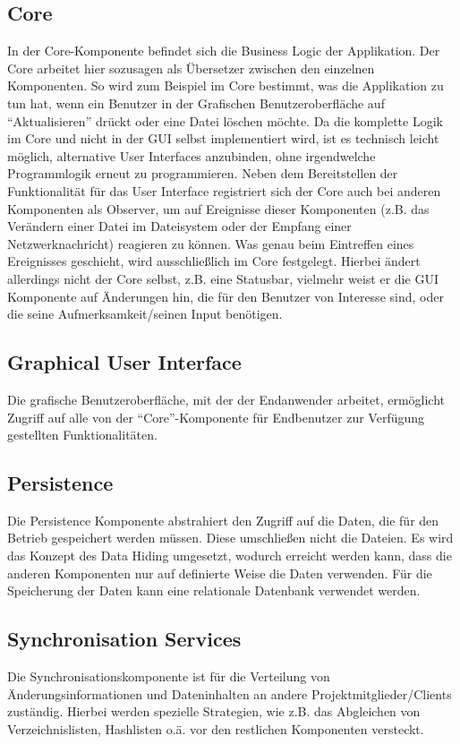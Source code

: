 \subsection{Core}
In der Core-Komponente befindet sich die Business Logic der Applikation. Der Core arbeitet hier sozusagen als Übersetzer zwischen den einzelnen Komponenten. So wird zum Beispiel im Core bestimmt, was die Applikation zu tun hat, wenn ein Benutzer in der Grafischen Benutzeroberfläche auf ``Aktualisieren'' drückt oder eine Datei löschen möchte. Da die komplette Logik im Core und nicht in der GUI selbst implementiert wird, ist es technisch leicht möglich, alternative User Interfaces anzubinden, ohne irgendwelche Programmlogik erneut zu programmieren. 
Neben dem Bereitstellen der Funktionalität für das User Interface registriert sich der Core auch bei anderen Komponenten als Observer, um auf Ereignisse dieser Komponenten (z.B. das Verändern einer Datei im Dateisystem oder der Empfang einer Netzwerknachricht) reagieren zu können. Was genau beim Eintreffen eines Ereignisses geschieht, wird ausschließlich im Core festgelegt. Hierbei ändert allerdings nicht der Core selbst, z.B. eine Statusbar, vielmehr weist er die GUI Komponente auf Änderungen hin, die für den Benutzer von Interesse sind, oder die seine Aufmerksamkeit/seinen Input benötigen.

\subsection{Graphical User Interface}
Die grafische Benutzeroberfläche, mit der der Endanwender arbeitet, ermöglicht Zugriff auf alle von der ``Core''-Komponente für Endbenutzer zur Verfügung gestellten
Funktionalitäten.

\subsection{Persistence} 
Die Persistence Komponente abstrahiert den Zugriff auf die Daten, die für den Betrieb gespeichert werden müssen. Diese umschließen nicht die Dateien. Es wird das Konzept des Data Hiding umgesetzt, wodurch erreicht werden kann, dass die anderen Komponenten nur auf definierte Weise die Daten verwenden. Für die Speicherung der Daten kann eine relationale Datenbank verwendet werden.

\subsection{Synchronisation Services}
Die Synchronisationskomponente ist für die Verteilung von Änderungsinformationen und Dateninhalten an andere Projektmitglieder/Clients zuständig. Hierbei werden spezielle Strategien, wie z.B. das Abgleichen von Verzeichnislisten, Hashlisten o.ä. vor den restlichen Komponenten versteckt.


